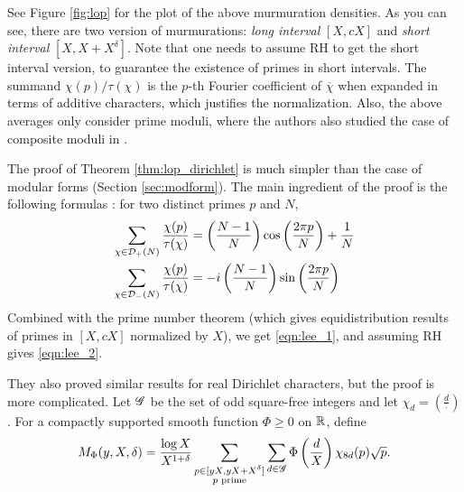 See Figure \ref{fig:lop} for the plot of the above murmuration densities.
As you can see, there are two version of murmurations: \emph{long interval} $[X, cX]$ and \emph{short interval} $[X, X + X^\delta]$.
Note that one needs to assume RH to get the short interval version, to guarantee the existence of primes in short intervals.
The summand $\chi(p) / \tau(\chi)$ is the $p$-th Fourier coefficient of $\overline{\chi}$ when expanded in terms of additive characters, which justifies the normalization.
Also, the above averages only consider prime moduli, where the authors also studied the case of composite moduli in \cite[Section 6.1]{lee2025murmurations}.

The proof of Theorem \ref{thm:lop_dirichlet} is much simpler than the case of modular forms (Section \ref{sec:modform}).
The main ingredient of the proof is the following formulas \cite[Lemma 2.6]{lee2025murmurations}: for two distinct primes $p$ and $N$,
\begin{align}
    \sum_{\chi \in \mathcal{D}_{+}(N)} \frac{\chi(p)}{\tau(\chi)} &= \left(\frac{N-1}{N}\right) \cos \left(\frac{2 \pi p}{N}\right) + \frac{1}{N} \\
    \sum_{\chi \in \mathcal{D}_{-}(N)} \frac{\chi(p)}{\tau(\chi)} &= -i\left(\frac{N-1}{N}\right) \sin \left(\frac{2 \pi p}{N}\right)
\end{align}
Combined with the prime number theorem (which gives equidistribution results of primes in $[X, cX]$ normalized by $X$), we get \eqref{eqn:lee_1}, and assuming RH gives \eqref{eqn:lee_2}.

They also proved similar results for real Dirichlet characters, but the proof is more complicated.
Let $\mathscr{G}$ be the set of odd square-free integers and let $\chi_{d} = \left(\frac{d}{\cdot}\right)$.
For a compactly supported smooth function $\Phi \ge 0$ on $\mathbb{R}$, define
\begin{equation}
    M_{\Phi}(y, X, \delta) = \frac{\log X}{X^{1 + \delta}} \sum_{\substack{p \in [yX, yX + X^\delta] \\ p \text{ prime}}} \sum_{d \in \mathscr{G}} \Phi\left(\frac{d}{X}\right) \chi_{8d}(p) \sqrt{p}.
\end{equation}

